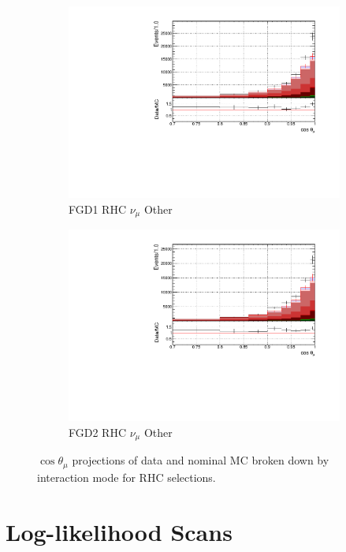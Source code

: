 \begin{figure}[!h]
\begin{subfigure}{0.49\textwidth}
  \centering
  \includegraphics[width=\textwidth]{figs/FGD1_NuMuBkg_CCOther_in_AntiNu_Mode_t}
  \caption{FGD1 RHC $\nu_{\mu}$ Other}
\end{subfigure}
\begin{subfigure}{0.49\textwidth}
  \centering
  \includegraphics[width=\textwidth]{figs/FGD2_NuMuBkg_CCOther_in_AntiNu_Mode_t}
  \caption{FGD2 RHC $\nu_{\mu}$ Other}
\end{subfigure}
\caption{$\cos\theta_{\mu}$ projections of data and nominal MC broken down by interaction mode for RHC \numu selections.}
\label{fig:tstack_rhc_numu}
\end{figure}

\section{Log-likelihood Scans}\label{sec:llhscan}

